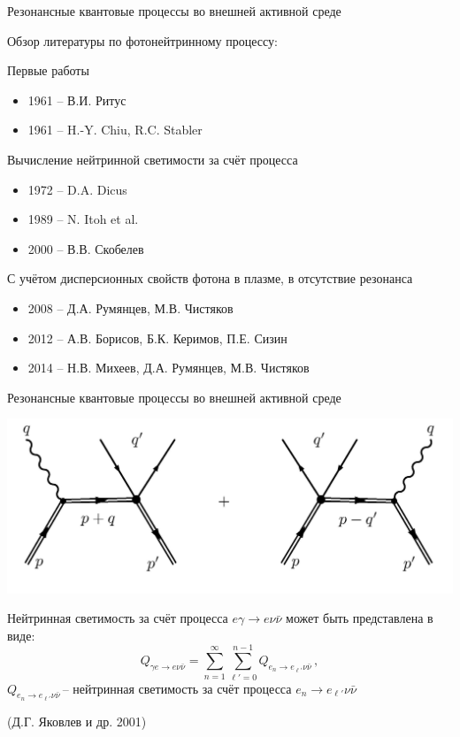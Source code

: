 \documentclass{beamer}
\begin{document}
\begin{frame}{Резонансные квантовые процессы во внешней активной среде}
\begin{center}
Обзор литературы по фотонейтринному процессу:
\end{center}
Первые работы
\begin{itemize}
\item 1961 -- В.И. Ритус
\item 1961 -- H.-Y. Chiu, R.C. Stabler
\end{itemize}
Вычисление нейтринной светимости за счёт процесса
\begin{itemize}
\item 1972 -- D.A. Dicus
\item 1989 -- N. Itoh et al.
\item 2000 -- В.В. Скобелев
\end{itemize}
С учётом дисперсионных свойств фотона в плазме, 
в отсутствие резонанса
\begin{itemize}
\item 2008 -- Д.А. Румянцев, М.В. Чистяков
\item 2012 -- А.В. Борисов, Б.К. Керимов, П.Е. Сизин
\item 2014 -- Н.В. Михеев, Д.А. Румянцев, М.В. Чистяков
\end{itemize}
\end{frame}
\begin{frame}{Резонансные квантовые процессы во внешней активной среде}
\begin{center}

\includegraphics[scale=0.1]{fig00.jpg}

Нейтринная светимость за счёт процесса $e\gamma\to e\nu\bar\nu$ может быть представлена в виде:
%
\alert{$$Q_{\gamma e \to e \nu \bar \nu} = \sum\limits_{n=1}^{\infty}
\sum\limits_{\ell'=0}^{n-1}  
Q_{e_n \to e_{\ell'} \nu \bar \nu}  \, ,$$}
$Q_{e_n \to e_{\ell'} \nu \bar \nu}\,$-- нейтринная светимость за счёт процесса $e_n\to e_{\ell'}\nu\bar\nu$

(Д.Г. Яковлев и др. 2001)
\end{center}
\end{frame}
\end{document}
